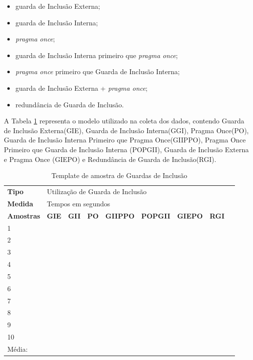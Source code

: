 \begin{itemize}
	\item guarda de Inclusão Externa;
	\item guarda de Inclusão Interna;
	\item \textit{pragma once};
	\item guarda de Inclusão Interna primeiro que \textit{pragma once};
	\item \textit{pragma once} primeiro que  Guarda de Inclusão Interna;
	\item guarda de Inclusão Externa + \textit{pragma once};
	\item redundância de Guarda de Inclusão.
\end{itemize}


A Tabela \ref{tab:modelo_guards} representa o modelo utilizado na coleta dos dados,
 contendo Guarda de Inclusão Externa(GIE), Guarda de Inclusão Interna(GGI),
 Pragma Once(PO), Guarda de Inclusão Interna Primeiro que Pragma Once(GIIPPO),
 Pragma Once Primeiro que Guarda de Inclusão Interna (POPGII),
 Guarda de Inclusão Externa e Pragma Once (GIEPO) e
 Redundância de Guarda de Inclusão(RGI).

\begin{table}[!ht]
\centering
\caption{Template de amostra de Guardas de Inclusão}
\label{tab:modelo_guards}
\begin{tiny}
\begin{tabular}{lp{1cm}p{1cm}p{1cm}p{1cm}p{1cm}p{1cm}p{1cm}p{1cm}}
\toprule
\textbf{Tipo} & \multicolumn{7}{l}{Utilização de Guarda de Inclusão} \\
\textbf{Medida} & \multicolumn{7}{l}{Tempos em segundos } \\
\textbf{Amostras} & \textbf{GIE} & \textbf{GII} & \textbf{PO} & 
\textbf{GIIPPO} & \textbf{POPGII} & \textbf{GIEPO} & \textbf{RGI} \\ \midrule
 1  &  &  &   &   &   &   &  \\ \midrule
 2  &  &  &   &   &   &   &  \\ \midrule
 3  &  &  &   &   &   &   &  \\ \midrule
 4  &  &  &   &   &   &   &  \\ \midrule
 5  &  &  &   &   &   &   &  \\ \midrule
 6  &  &  &   &   &   &   &  \\ \midrule
 7  &  &  &   &   &   &   &  \\ \midrule 
 8  &  &  &   &   &   &   &  \\ \midrule
 9  &  &  &   &   &   &   &  \\ \midrule
 10 &  &  &   &   &   &   &  \\ \midrule
 Média: & & & & &   &   &    \\ \bottomrule
\end{tabular}
\end{tiny}
\end{table}

